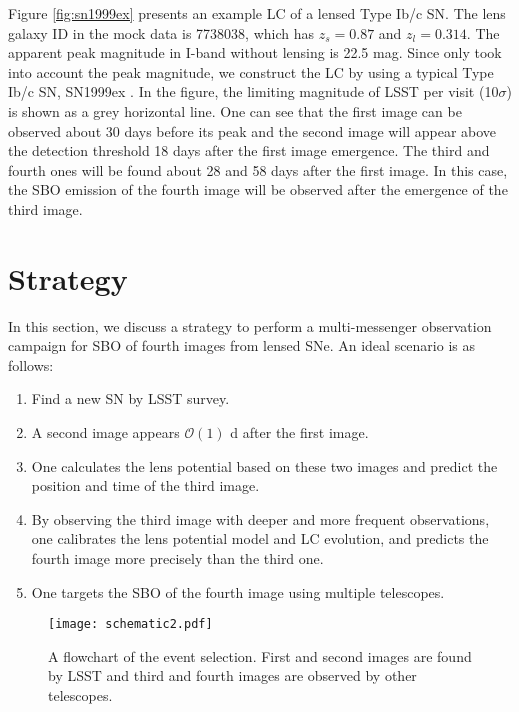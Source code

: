 \documentclass[useAMS,usenatbib,twocolumn]{mnras}
\begin{document}
Figure \ref{fig:sn1999ex} presents an example LC of a lensed Type Ib/c
SN. The lens galaxy ID in the mock data is 7738038, which has
$z_s=0.87$ and $z_l=0.314$. The apparent peak magnitude in I-band
without lensing is 22.5 mag. Since \cite{ogur10} only took into
account the peak magnitude, we construct the LC by using a typical
Type Ib/c SN, SN1999ex \citep{stri02}. In the figure, the limiting
magnitude of LSST per visit (10$\sigma$) is shown as a grey horizontal
line. One can see that the first image can be observed about 30 days
before its peak and the second image will appear above the detection
threshold 18 days after the first image emergence. The third and
fourth ones will be found about 28 and 58 days after the first
image. In this case, the SBO emission of the fourth image will be
observed after the emergence of the third image.


\section{Strategy}
\label{sec:strategy}

In this section, we discuss a strategy to perform a multi-messenger
observation campaign for SBO of fourth images from lensed SNe. An
ideal scenario is as follows:
\begin{enumerate}
\item Find a new SN by LSST survey.
\item A second image appears $\mathcal{O}(1)$ d after the first image.
\item One calculates the lens potential based on these two images and
  predict the position and time of the third image.
\item By observing the third image with deeper and more frequent
  observations, one calibrates the lens potential model and LC
  evolution, and predicts the fourth image more precisely than the
  third one.
\item One targets the SBO of the fourth image using multiple
  telescopes.
\end{enumerate}


\begin{figure}
\centering
\texttt{[image: schematic2.pdf]}
\caption{A flowchart of the event selection. First and second images
  are found by LSST and third and fourth images are observed by other
  telescopes.}
\label{fig:schematic}
\end{figure}
\end{document}
